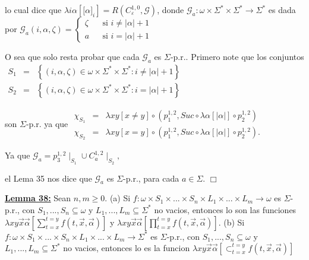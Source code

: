 lo cual dice que \(\lambda i\alpha \left[ \lbrack \alpha ]_{i}\right] =R\left( C_{\varepsilon }^{1,0},\mathcal{G}\right) \), donde \(\mathcal{G} _{a}:\omega \times \Sigma ^{\ast }\times \Sigma ^{\ast }\rightarrow \Sigma ^{\ast }\) es dada por
\(\displaystyle \mathcal{G}_{a}(i,\alpha ,\zeta )=\left\{ \begin{array}{lll} \zeta & & \text{si }i\neq \left\vert \alpha \right\vert +1 \\ a & & \text{si }i=\left\vert \alpha \right\vert +1 \end{array} \right. \)

O sea que solo resta probar que cada \(\mathcal{G}_{a}\) es \(\Sigma \)-p.r.. Primero note que los conjuntos
\(\displaystyle \begin{array}{rcl} S_{1} & =& \left\{ (i,\alpha ,\zeta )\in \omega \times \Sigma ^{\ast }\times \Sigma ^{\ast }:i\neq \left\vert \alpha \right\vert +1\right\} \\ S_{2} & =& \left\{ (i,\alpha ,\zeta )\in \omega \times \Sigma ^{\ast }\times \Sigma ^{\ast }:i=\left\vert \alpha \right\vert +1\right\} \end{array} \)

son \(\Sigma \)-p.r. ya que
\(\displaystyle \begin{array}{rcl} \chi _{S_{1}} & =& \lambda xy\left[ x\neq y\right] \circ \left( p_{1}^{1,2},Suc\circ \lambda \alpha \left[ \left\vert \alpha \right\vert \right] \circ p_{2}^{1,2}\right) \\ \chi _{S_{2}} & =& \lambda xy\left[ x=y\right] \circ \left( p_{1}^{1,2},Suc\circ \lambda \alpha \left[ \left\vert \alpha \right\vert \right] \circ p_{2}^{1,2}\right) . \end{array} \)

Ya que
\(\displaystyle \mathcal{G}_{a}=p_{3}^{1,2}\mid _{S_{1}}\cup C_{a}^{1,2}\mid _{S_{2}}, \)

el Lema 35 nos dice que \(\mathcal{G}_{a}\) es \(\Sigma \)-p.r., para cada \(a\in \Sigma \). \(\Box\)


\textbf{\underline{Lemma 38:}} Sean \(n,m\geq 0\).
(a) Si \(f:\omega \times S_{1}\times ...\times S_{n}\times L_{1}\times ...\times L_{m}\rightarrow \omega \) es \(\Sigma \)-p.r., con \( S_{1},...,S_{n}\subseteq \omega \) y \(L_{1},...,L_{m}\subseteq \Sigma ^{\ast } \) no vacios, entonces lo son las funciones \(\lambda xy\vec{x}\vec{\alpha} \left[ \sum_{t=x}^{t=y}f(t,\vec{x},\vec{\alpha})\right] \) y \(\lambda xy\vec{x }\vec{\alpha}\left[ \prod_{t=x}^{t=y}f(t,\vec{x},\vec{\alpha})\right] \).
(b) Si \(f:\omega \times S_{1}\times ...\times S_{n}\times L_{1}\times ...\times L_{m}\rightarrow \Sigma ^{\ast }\) es \(\Sigma \)-p.r., con \( S_{1},...,S_{n}\subseteq \omega \) y \(L_{1},...,L_{m}\subseteq \Sigma ^{\ast } \) no vacios, entonces lo es la funcion \(\lambda xy\vec{x}\vec{\alpha}\left[ \subset _{t=x}^{t=y}f(t,\vec{x},\vec{\alpha})\right] \)

